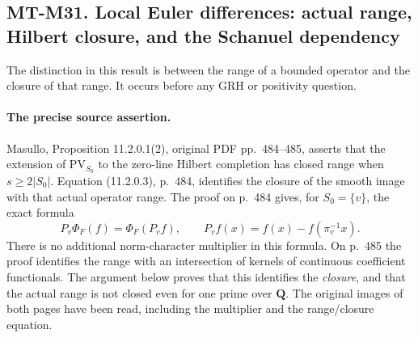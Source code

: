 \subsection*{MT-M31. Local Euler differences: actual range, Hilbert closure,
and the Schanuel dependency}

The distinction in this result is between the range of a bounded
operator and the closure of that range.  It occurs before any
GRH or positivity question.

\paragraph{The precise source assertion.}
Masullo, Proposition 11.2.0.1(2), original PDF pp.~484--485,
asserts that the extension of $\mathrm{PV}_{S_0}$ to the
zero-line Hilbert completion has closed range when
$s\geq 2|S_0|$.  Equation (11.2.0.3), p.~484, identifies
the closure of the smooth image with that actual operator range.
The proof on p.~484 gives, for $S_0=\{v\}$, the exact formula
\[
  P_v\Phi_F(f)=\Phi_F(P_vf),\qquad
  P_vf(x)=f(x)-f(\pi_v^{-1}x).
  \tag{M31.1}
\]
There is no additional norm-character multiplier in this formula.
On p.~485 the proof identifies the range with an intersection
of kernels of continuous coefficient functionals.  The argument
below proves that this identifies the \emph{closure}, and that
the actual range is not closed even for one prime over $\mathbf Q$.
The original images of both pages have been read, including
the multiplier and the range/closure equation.

